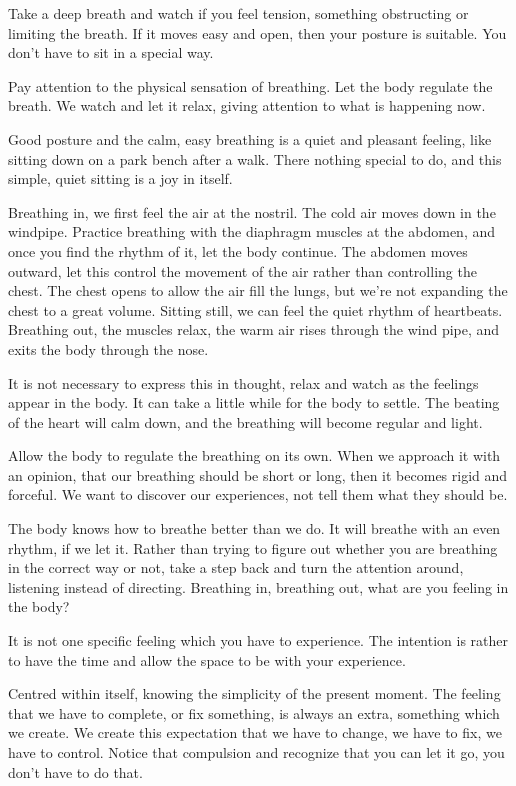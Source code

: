 Take a deep breath and watch if you feel tension, something obstructing
or limiting the breath. If it moves easy and open, then your posture is
suitable. You don't have to sit in a special way.

Pay attention to the physical sensation of breathing. Let the body
regulate the breath. We watch and let it relax, giving attention to what
is happening now.

Good posture and the calm, easy breathing is a quiet and pleasant
feeling, like sitting down on a park bench after a walk. There nothing
special to do, and this simple, quiet sitting is a joy in itself.

Breathing in, we first feel the air at the nostril. The cold air moves
down in the windpipe. Practice breathing with the diaphragm muscles at
the abdomen, and once you find the rhythm of it, let the body continue.
The abdomen moves outward, let this control the movement of the air
rather than controlling the chest. The chest opens to allow the air fill
the lungs, but we're not expanding the chest to a great volume. Sitting
still, we can feel the quiet rhythm of heartbeats. Breathing out, the
muscles relax, the warm air rises through the wind pipe, and exits the
body through the nose.

It is not necessary to express this in thought, relax and watch as the
feelings appear in the body. It can take a little while for the body to
settle. The beating of the heart will calm down, and the breathing will
become regular and light.

Allow the body to regulate the breathing on its own. When we approach it
with an opinion, that our breathing should be short or long, then it
becomes rigid and forceful. We want to discover our experiences, not
tell them what they should be.

The body knows how to breathe better than we do. It will breathe with an
even rhythm, if we let it. Rather than trying to figure out whether you
are breathing in the correct way or not, take a step back and turn the
attention around, listening instead of directing. Breathing in,
breathing out, what are you feeling in the body?

It is not one specific feeling which you have to experience. The
intention is rather to have the time and allow the space to be with your
experience.

Centred within itself, knowing the simplicity of the present moment. The
feeling that we have to complete, or fix something, is always an extra,
something which we create. We create this expectation that we have to
change, we have to fix, we have to control. Notice that compulsion and
recognize that you can let it go, you don't have to do that.

